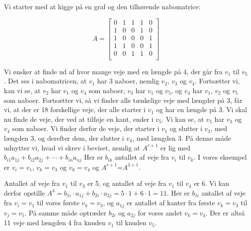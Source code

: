 \begin{exmp}
Vi starter med at kigge på en graf og den tilhørende nabomatrice:


\begin{equation}
A=\begin{bmatrix}
    0&1&1&1&0\\
    1&0&0&1&0\\
    1&0&0&0&1\\
    1&1&0&0&1\\
    0&0&1&1&0\\
\end{bmatrix}
\end{equation}


Vi ønsker at finde ud af hvor mange veje med en længde på 4, der går fra $v_1$ til $v_5$. Det ses i nabomatricen, at $v_1$ har 3 naboer, nemlig $v_2$, $v_3$ og $v_4$. Fortsætter vi, kan vi se, at $v_2$ har $v_1$ og $v_4$ som naboer, $v_3$ har $v_1$ og $v_5$, og $v_4$ har $v_1$, $v_2$ og $v_5$ som naboer. Fortsætter vi, så vi finder alle tænkelige veje med længder på 3, får vi, at der er 18 forskellige veje, der alle starter i $v_1$ og har en længde på 3. Vi skal nu finde de veje, der ved at tilføje en kant, ender i $v_5$. Vi kan se, at $v_5$ har $v_3$ og $v_4$ som naboer. Vi finder derfor de veje, der starter i $v_1$ og slutter i $v_3$, med længden 3, og derefter dem, der slutter i $v_4$, med længden 3. På denne måde udnytter vi, hvad vi skrev i beviset, nemlig at
\textbf{$A^{r+1}$} er lig med $b_{i1}a_{1j} + b_{i2}a_{2j} +\cdots+ b_{in}a_{nj}$
Her er $b_{ik}$ antallet af veje fra $v_{i}$ til ${v_k}$. I vores eksempel er $v_{i}=v_{1}$, ${v_k}=v_{3}$ og ${v_k}=v_{4}$ og \textbf{$A^{r+1}$}=\textbf{$A^{3+1}$}. 
 


Antallet af veje fra $v_{1}$ til $v_{3}$ er 5, og antallet af veje fra $v_{1}$ til $v_{4}$ er 6. Vi kan derfor opstille
\textbf{$A^{4}$}$=b_{1i} \cdot a_{1j}+b_{2i} \cdot a_{2j}=5 \cdot 1+6 \cdot 1=11$.
Her er $b_{1i}$ antallet af veje fra $v_{i}=v_{1}$ til vores første $v_{k}=v_{3}$, og $a_{1j}$ er antallet af kanter fra første $v_{k}=v_{3}$ til  $v_{j}=v_{5}$. På samme måde optræder $b_{2i}$ og $a_{2j}$ for vores andet $v_{k}=v_{4}$. Der er altså 11 veje med længden 4 fra knuden $v_{1}$ til knuden $v_{5}$.

\end{exmp}

